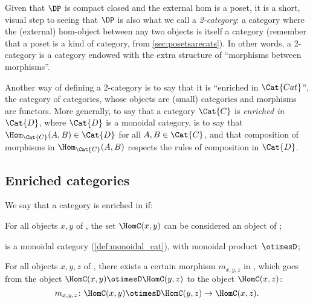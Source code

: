 Given that $\DP$ is compact closed and the external hom is a poset, it is a short, visual step to seeing that $\DP$ is also what we call a \emph{2-category}: a category where the (external) hom-object between any two objects is itself a category (remember that a poset is a kind of category, from \cref{sec:posetsarecats}). In other words, a 2-category is a category endowed with the extra structure of ``morphisms between morphisms''.

Another way of defining a 2-category is to say that it is ``enriched in $\Cat{Cat}$'', the category of categories, whose objects are (small) categories and morphisms are functors. More generally, to say that a category $\Cat{C}$ is \emph{enriched in $\Cat{D}$}, where $\Cat{D}$ is a monoidal category, is to say that $\Hom_\Cat{C}(A,B) \in \Cat{D}$ for all $A,B \in \Cat{C}$, and that composition of morphisms in $\Hom_\Cat{C}(A,B)$ respects the rules of composition in $\Cat{D}$.

\subsection{Enriched categories}

\begin{shaded}
\begin{definition}
We say that a category \CatC is enriched in \CatD if:
\begin{compactenum}
    \item For all objects $x, y$ of \CatC, the set $\HomC(x,y)$ can be considered an object of \CatD;
    \item \CatD is a monoidal category (\cref{def:monoidal_cat}),
    with monoidal product~$\otimesD$;
    \item For all objects $x, y, z$ of \CatC, there exists
    a certain morphism $m_{x,y,z}$ in \CatD,
    which goes from the object $\HomC(x, y) \otimesD \HomC(y, z)$ to the object $\HomC(x, z)$:
    \begin{equation} \label{eq:enriched-condition}
        m_{x,y,z} \colon \HomC(x, y) \otimesD \HomC(y, z) \to \HomC(x, z) .
    \end{equation}
\end{compactenum}
\end{definition}
\end{shaded}

%

